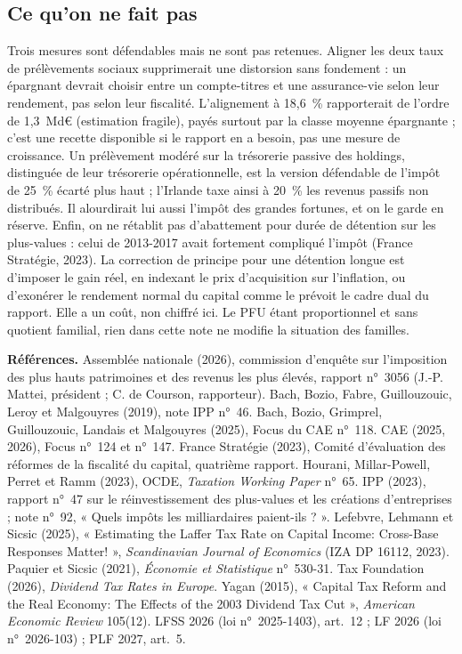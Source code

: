 \documentclass[11pt,a4paper]{article}
\begin{document}
\subsection*{Ce qu'on ne fait pas}

Trois mesures sont défendables mais ne sont pas retenues. Aligner les deux taux de prélèvements sociaux
supprimerait une distorsion sans fondement : un épargnant devrait choisir entre un compte-titres et une
assurance-vie selon leur rendement, pas selon leur fiscalité. L'alignement à 18,6~\% rapporterait de l'ordre
de 1,3~Md€ (estimation fragile), payés surtout par la classe moyenne épargnante ; c'est une recette
disponible si le rapport en a besoin, pas une mesure de croissance. Un prélèvement modéré sur la trésorerie
passive des holdings, distinguée de leur trésorerie opérationnelle, est la version défendable de l'impôt de
25~\% écarté plus haut ; l'Irlande taxe ainsi à 20~\% les revenus passifs non distribués. Il alourdirait lui
aussi l'impôt des grandes fortunes, et on le garde en réserve. Enfin,
on ne rétablit pas d'abattement pour durée de détention sur les plus-values : celui de 2013-2017 avait
fortement compliqué l'impôt (France Stratégie, 2023). La correction de principe pour une détention longue est d'imposer
le gain réel, en indexant le prix d'acquisition sur l'inflation, ou d'exonérer le rendement normal du
capital comme le prévoit le cadre dual du rapport. Elle a un coût, non chiffré ici. Le PFU étant
proportionnel et sans quotient familial, rien dans cette note ne modifie la situation des familles.

\vspace{6pt}
{\scriptsize\textbf{Références.} Assemblée nationale (2026), commission d'enquête sur l'imposition des plus
hauts patrimoines et des revenus les plus élevés, rapport n°~3056 (J.-P. Mattei, président ; C. de Courson,
rapporteur). Bach, Bozio, Fabre, Guillouzouic, Leroy et Malgouyres (2019), note IPP n°~46. Bach, Bozio, Grimprel, Guillouzouic, Landais et Malgouyres
(2025), Focus du CAE n°~118. CAE (2025, 2026), Focus n°~124 et n°~147. France Stratégie (2023), Comité
d'évaluation des réformes de la fiscalité du capital, quatrième rapport. Hourani, Millar-Powell, Perret et
Ramm (2023), OCDE, \emph{Taxation Working Paper} n°~65. IPP (2023), rapport n°~47 sur le réinvestissement des
plus-values et les créations d'entreprises ; note n°~92, « Quels impôts les milliardaires paient-ils ? ». Lefebvre, Lehmann et Sicsic (2025), « Estimating the Laffer Tax
Rate on Capital Income: Cross-Base Responses Matter! », \emph{Scandinavian Journal of Economics} (IZA DP
16112, 2023). Paquier et Sicsic (2021), \emph{Économie et Statistique} n°~530-31. Tax Foundation (2026),
\emph{Dividend Tax Rates in Europe}. Yagan (2015), « Capital Tax Reform and the Real Economy: The Effects of
the 2003 Dividend Tax Cut », \emph{American Economic Review} 105(12). LFSS 2026 (loi n°~2025-1403), art.~12 ;
LF 2026 (loi n°~2026-103) ; PLF 2027, art.~5.\par}
\end{document}
